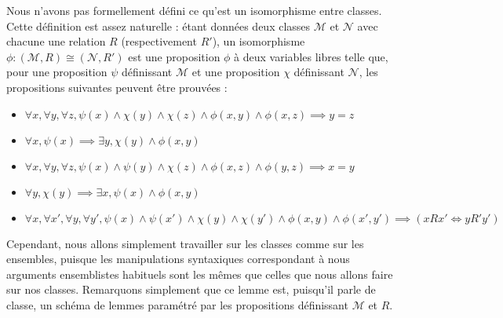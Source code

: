 \begin{remark}
  Nous n'avons pas formellement défini ce qu'est un isomorphisme entre classes.
  Cette définition est assez naturelle : étant données deux classes $\mathcal M$
  et $\mathcal N$ avec chacune une relation $R$ (respectivement $R'$), un
  isomorphisme $\phi : (\mathcal M,R)\cong (\mathcal N,R')$ est une proposition
  $\phi$ à deux variables libres telle que, pour une proposition $\psi$
  définissant $\mathcal M$ et une proposition $\chi$ définissant $\mathcal N$,
  les propositions suivantes peuvent être prouvées :
  \begin{itemize}
  \item $\forall x,\forall y,\forall z, \psi(x)\land \chi(y)\land\chi(z)\land
    \phi(x,y)\land\phi(x,z) \implies y = z$
  \item $\forall x,\psi(x)\implies \exists y, \chi(y)\land \phi(x,y)$
  \item $\forall x,\forall y,\forall z, \psi(x)\land\psi(y)\land\chi(z)\land
    \phi(x,z)\land\phi(y,z)\implies x = y$
  \item $\forall y,\chi(y)\implies \exists x, \psi(x)\land \phi(x,y)$
  \item $\forall x,\forall x',\forall y, \forall y', \psi(x)\land\psi(x')\land
    \chi(y)\land\chi(y')\land\phi(x,y)\land\phi(x',y')\implies
    (xR x'\iff yR' y')$
  \end{itemize}

  Cependant, nous allons simplement travailler sur les classes comme sur les
  ensembles, puisque les manipulations syntaxiques correspondant à nous arguments
  ensemblistes habituels sont les mêmes que celles que nous allons faire sur nos
  classes. Remarquons simplement que ce lemme est, puisqu'il parle de classe,
  un schéma de lemmes paramétré par les propositions définissant $\mathcal M$ et
  $R$.
\end{remark}

